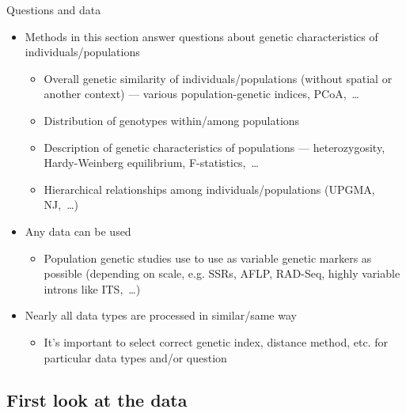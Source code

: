 \documentclass[compress, ucs, xelatex, 11pt, xcolor=svgnames, aspectratio=169,
	hyperref={
		bookmarks=true,
		unicode=true,
		colorlinks=true,
		pdftitle={Molecular data in R},
		plainpages=false,
		pdfauthor={Vojtech Zeisek},
		pdfsubject={Course about phylogeny and evolution in R},
		pdfcreator={XeLaTeX},
		pdfkeywords={R, evolution, phylogeny, molecular data},
		linkcolor=Crimson, %
		anchorcolor=Magenta, %
		citecolor=Magenta, %
		filecolor=Magenta, %
		menucolor=Magenta, %
		urlcolor=DodgerBlue, %
		pdftex},
	url={hyphens, lowtilde} %
	]{beamer}
\begin{document}
\begin{frame}{Questions and data}
	\begin{itemize}
		\item Methods in this section answer questions about genetic characteristics of individuals/populations
		\begin{itemize}
			\item Overall genetic similarity of individuals/populations (without spatial or another context) --- various population-genetic indices, PCoA,~\ldots
			\item Distribution of genotypes within/among populations
			\item Description of genetic characteristics of populations --- heterozygosity, Hardy-Weinberg equilibrium, F-statistics,~\ldots
			\item Hierarchical relationships among individuals/populations (UPGMA, NJ,~\ldots)
		\end{itemize}
		\item Any data can be used
		\begin{itemize}
			\item Population genetic studies use to use as variable genetic markers as possible (depending on scale, e.g. SSRs, AFLP, RAD-Seq, highly variable introns like ITS,~\ldots)
		\end{itemize}
		\item Nearly all data types are processed in similar/same way
		\begin{itemize}
			\item It's important to select correct genetic index, distance method, etc. for particular data types and/or question
		\end{itemize}
	\end{itemize}
\end{frame}

\subsection{First look at the data}
\end{document}
